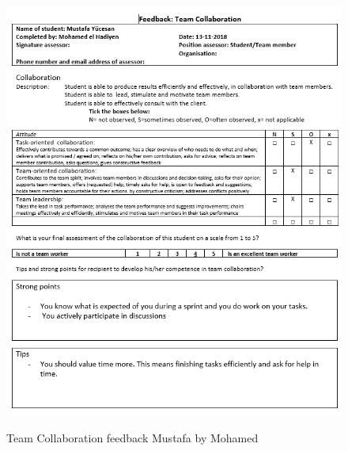 \documentclass[12pt]{article}
\begin{document}
	\begin{figure}[p!]
		\centering
		\includegraphics[width=\columnwidth]{CoopMustafa1.PNG}\\
		\caption{Team Collaboration feedback Mustafa by Mohamed}
	\end{figure}
\end{document}

